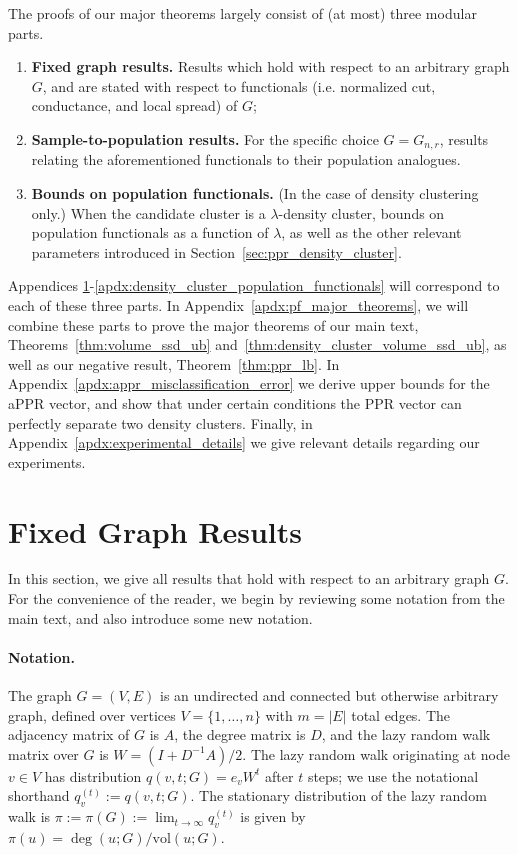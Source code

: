 \documentclass[twoside,11pt]{article}
\newcommand{\1}{\mathbf{1}}
\newcommand{\vol}{\mathrm{vol}}
\begin{document}

\clearpage
\appendix
The proofs of our major theorems largely consist of (at most) three modular parts.
\begin{enumerate}
	\item \textbf{Fixed graph results.} Results which hold with respect to an arbitrary graph $G$, and are stated with respect to functionals (i.e. normalized cut, conductance, and local spread) of $G$;
	\item \textbf{Sample-to-population results.} For the specific choice $G = G_{n,r}$, results relating the aforementioned functionals to their population analogues. 
	\item \textbf{Bounds on population functionals.} (In the case of density clustering only.) When the candidate cluster is a $\lambda$-density cluster, bounds on population functionals as a function of $\lambda$, as well as the other relevant parameters introduced in Section~\ref{sec:ppr_density_cluster}.
\end{enumerate}

Appendices \ref{apdx:fixed_graph}-\ref{apdx:density_cluster_population_functionals} will correspond to each of these three parts. In Appendix~\ref{apdx:pf_major_theorems}, we will combine these parts to prove the major theorems of our main text, Theorems~\ref{thm:volume_ssd_ub} and~\ref{thm:density_cluster_volume_ssd_ub}, as well as our negative result, Theorem~\ref{thm:ppr_lb}. In Appendix~\ref{apdx:appr_misclassification_error} we derive upper bounds for the aPPR vector, and show that under certain conditions the PPR vector can perfectly separate two density clusters. Finally, in Appendix~\ref{apdx:experimental_details} we give relevant details regarding our experiments.

\section{Fixed Graph Results}
\label{apdx:fixed_graph}
In this section, we give all results that hold with respect to an arbitrary graph $G$. For the convenience of the reader, we begin by reviewing some notation from the main text, and also introduce some new notation. \\

\paragraph{Notation.}
The graph $G = (V,E)$ is an undirected and connected but otherwise arbitrary graph, defined over vertices $V = \{1,\ldots,n\}$ with $m = |E|$ total edges. The adjacency matrix of $G$ is $A$, the degree matrix is $D$, and the lazy random walk matrix over $G$ is $W = (I + D^{-1}A)/2$. The lazy random walk originating at node $v \in V$ has distribution $q(v,t;G) = e_vW^t$ after $t$ steps; we use the notational shorthand $q_v^{(t)} := q(v,t;G)$. The stationary distribution of the lazy random walk is $\pi := \pi(G) := \lim_{t \to \infty} q_v^{(t)}$ is given by $\pi(u) = \deg(u;G)/\vol(u;G)$.
\end{document}
